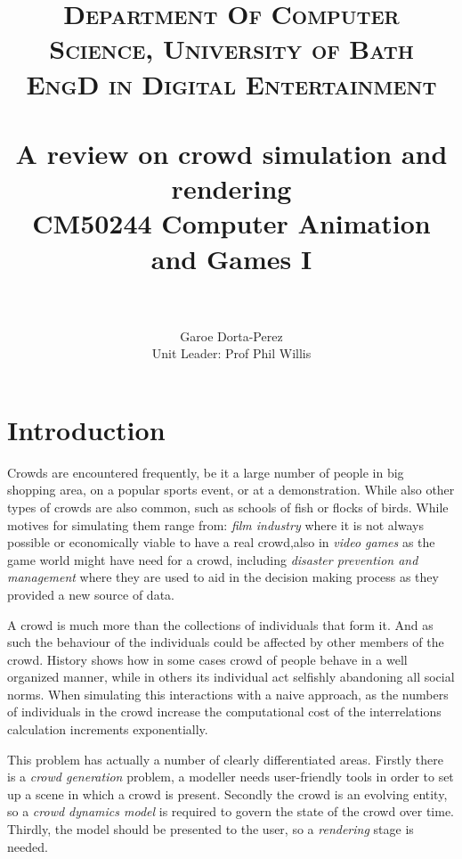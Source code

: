 \documentclass[11pt,twocolumn]{article}
\title{	
\normalfont \normalsize 
\textsc{Department Of Computer Science, University of Bath} \\ [5pt] %
\textsc{EngD in Digital Entertainment} \\ [5pt] 
\horrule{0.7pt} \\[0.2cm] %
\Huge A review on crowd simulation and rendering \\ %
\vspace{7 mm}
\Large CM50244 \: Computer Animation and Games I \\
\horrule{0.7pt} \\[0.0cm] %
}
\author{Garoe Dorta-Perez \\ \Large Unit Leader: Prof Phil Willis \\}  %
\numberwithin{equation}{section} %
\numberwithin{figure}{section} %
\numberwithin{table}{section} %
\begin{document}
\vspace*{\fill}
\begin{center}
\begin{minipage}{1.0\textwidth}

\clearpage\maketitle %
\thispagestyle{empty}

\end{minipage}
\end{center}
\vfill
\clearpage
\setcounter{page}{1}



\section{Introduction}
\label{intro}

Crowds are encountered frequently, be it a large number of people in big shopping area, on a popular sports event, or at a demonstration.
While also other types of crowds are also common, such as schools of fish or flocks of birds.
While motives for simulating them range from: \textit{film industry} where it is not always possible or economically viable to have a real crowd,also in \textit{video games} as the game world might have need for a crowd, including \textit{disaster prevention and management} where they are used to aid in the decision making process as they provided a new source of data.

A crowd is much more than the collections of individuals that form it.
And as such the behaviour of the individuals could be affected by other members of the crowd.
History shows how in some cases crowd of people behave in a well organized manner, while in others its individual act selfishly abandoning all social norms.
When simulating this interactions with a naive approach, as the numbers of individuals in the crowd increase the computational cost of the interrelations calculation increments exponentially.

This problem has actually a number of clearly differentiated areas.
Firstly there is a \textit{crowd generation} problem, a modeller needs user-friendly tools in order to set up a scene in which a crowd is present.
Secondly the crowd is an evolving entity, so a \textit{crowd dynamics model} is required to govern the state of the crowd over time.
Thirdly, the model should be presented to the user, so a \textit{rendering} stage is needed.
\end{document}
